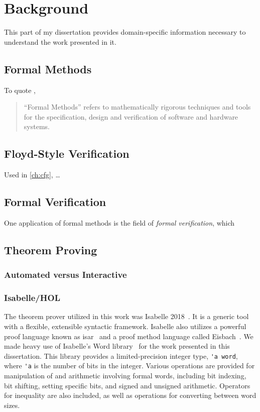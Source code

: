 \chapter{Background}\label{ch:background}
This part of my dissertation provides domain-specific information necessary to understand
the work presented in it.

\section{Formal Methods}
To quote \citet{butler:fm},
\begin{quote}
  ``Formal Methods''%
  refers to mathematically rigorous techniques and tools
  for the specification, design and verification of software and hardware systems.
\end{quote}

\section{Floyd-Style Verification}\label{ch:floyd}%
Used in \cref{ch:cfg},
\dots

\section{Formal Verification}
One application of formal methods is the field of \emph{formal verification},%
which 

\section{Theorem Proving}
%

\subsection{Automated versus Interactive}

\subsection{Isabelle/HOL}
The theorem prover utilized in this work
was Isabelle 2018~\citep{nipkow2002isabelle}.%
It is a generic tool with a flexible, extensible syntactic framework.
Isabelle also utilizes a powerful proof language
known as \ac{isar}~\citep{wenzel2007isabelle}
and a proof method language called Eisbach~\citep{matichuk2016eisbach}.
We made heavy use of Isabelle's Word library~\citep{isabelle-word-session}
for the work presented in this dissertation.
This library provides a limited-precision integer type, \lstinline|'a word|,
where \lstinline|'a| is the number of bits in the integer.
Various operations are provided for manipulation of and arithmetic involving formal words,
including bit indexing, bit shifting, setting specific bits,
and signed and unsigned arithmetic.
Operators for inequality are also included,
as well as operations for converting between word sizes.



